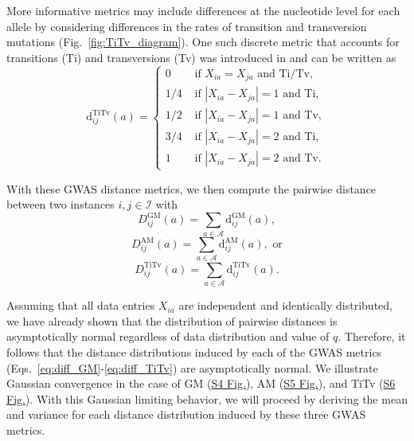 \documentclass[10pt,letterpaper]{article}
\begin{document}
More informative metrics may include differences at the nucleotide level for each allele by considering differences in the rates of transition and transversion mutations (Fig.~\ref{fig:TiTv_diagram}). One such discrete metric that accounts for transitions (Ti) and transversions (Tv) was introduced in \cite{arabnejad2018} and can be written as
%
\begin{equation}\label{eq:diff_TiTv}
\text{d}^\text{TiTv}_{ij}(a) = \begin{cases}
0 & \text{ if } X_{ia} = X_{ja} \text{ and Ti/Tv}, \\
1/4 & \text{ if } |X_{ia} - X_{ja}|=1 \text{ and Ti}, \\
1/2 & \text{ if } |X_{ia} - X_{ja}|=1 \text{ and Tv}, \\
3/4 & \text{ if } |X_{ia} - X_{ja}|=2 \text{ and Ti}, \\
1 & \text{ if } |X_{ia} - X_{ja}|=2 \text{ and Tv}.
\end{cases}
\end{equation}

With these GWAS distance metrics, we then compute the pairwise distance between two instances $i,j \in \mathcal{I}$ with
%
\begin{equation}\label{eq:D_GM}
D^\text{GM}_{ij}(a) = \sum_{a \in \mathcal{A}} \text{d}^\text{GM}_{ij}(a),
\end{equation}
%
\begin{equation}\label{eq:D_AM}
D^\text{AM}_{ij}(a) = \sum_{a \in \mathcal{A}} \text{d}^\text{AM}_{ij}(a), \text{ or}
\end{equation}
%
\begin{equation}\label{eq:D_TiTv}
D^\text{TiTv}_{ij}(a) = \sum_{a \in \mathcal{A}} \text{d}^\text{TiTv}_{ij}(a).
\end{equation}

Assuming that all data entries $X_{ia}$ are independent and identically distributed, we have already shown that the distribution of pairwise distances is asymptotically normal regardless of data distribution and value of $q$. Therefore, it follows that the distance distributions induced by each of the GWAS metrics (Eqs.~\ref{eq:diff_GM}-\ref{eq:diff_TiTv}) are asymptotically normal. We illustrate Gaussian convergence in the case of GM (\hyperlink{S4_Fig}{S4 Fig.}), AM (\hyperlink{S5_Fig}{S5 Fig.}), and TiTv (\hyperlink{S6_Fig}{S6 Fig.}). With this Gaussian limiting behavior, we will proceed by deriving the mean and variance for each distance distribution induced by these three GWAS metrics. 
\end{document}
